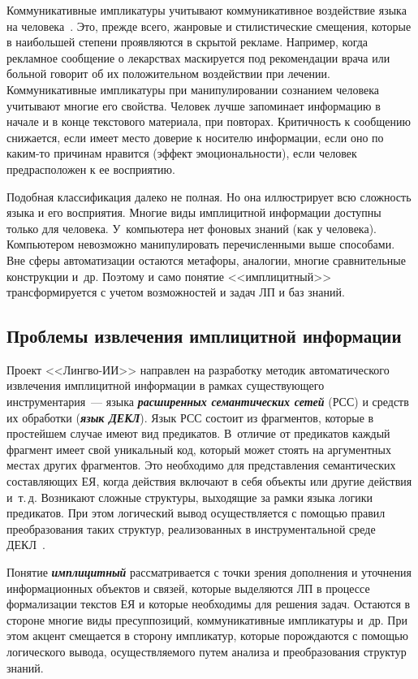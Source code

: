 \begin{multicols}{2}
     Коммуникативные импликатуры учитывают коммуникативное 
воздействие языка на человека~\cite{10kuz}. Это, прежде всего, жанровые и 
стилистические смещения, которые в наибольшей степени проявляются в 
скрытой рекламе. Например, когда рекламное сообщение о лекарствах 
маскируется под рекомендации врача или больной говорит об их 
положительном воздействии при лечении. Коммуникативные импликатуры при 
манипулировании сознанием человека учитывают многие его свойства. Человек 
лучше запоминает информацию в начале и в конце текстового материала, при 
повторах. Критичность к сообщению снижается, если имеет место доверие к 
носителю информации, если оно по каким-то причинам нравится (эффект 
эмоциональности), если человек предрасположен к ее восприятию. 
     
     Подобная классификация далеко не полная. Но она иллюстрирует всю 
сложность языка и его восприятия. Многие виды имплицитной информации 
доступны только для человека. У~компьютера нет фоновых знаний (как у 
человека). Компьютером невозможно манипулировать перечисленными выше 
способами. Вне сферы автоматизации остаются метафоры, аналогии, многие 
сравнительные конструкции и~др. Поэтому и само понятие <<имплицитный>> 
трансформируется с учетом возможностей и задач ЛП и баз знаний.
 
\subsection{Проблемы извлечения имплицитной информации}
     
     Проект <<Лингво-ИИ>> направлен на разработку методик 
автоматического извлечения имплицитной информации в рамках 
существующего инструментария~--- языка {\bfseries\textit{расширенных 
семантических сетей}} (РСС) и средств их обработки ({\bfseries\textit{язык 
ДЕКЛ}}). Язык РСС состоит из фрагментов, которые в прос\-тей\-шем случае 
имеют вид предикатов. В~отличие от предикатов каждый фрагмент имеет свой 
уникальный код, который может стоять на аргументных местах других 
фрагментов. Это необходимо для представления семантических составляющих 
ЕЯ, когда действия включают в себя объекты или другие действия и~т.\,д. 
Возникают сложные структуры, выходящие за рамки языка логики предикатов. 
При этом логический вывод осуществляется с помощью правил преобразования 
таких структур, реализованных в инструментальной среде ДЕКЛ~\cite{3kuz}. 
     
     Понятие {\bfseries\textit{имплицитный}} рассматривается с точки зрения 
дополнения и уточнения информационных объектов и связей, которые 
выделяются ЛП в процессе формализации текстов ЕЯ и которые необходимы 
для решения задач. Остаются в стороне многие виды пресуппозиций, 
коммуникативные импликатуры и~др. При этом акцент смещается в сторону 
импликатур, которые порождаются с по\-мощью логического вывода, 
осуществляемого путем анализа и преобразования структур знаний. 
     

\end{multicols}
